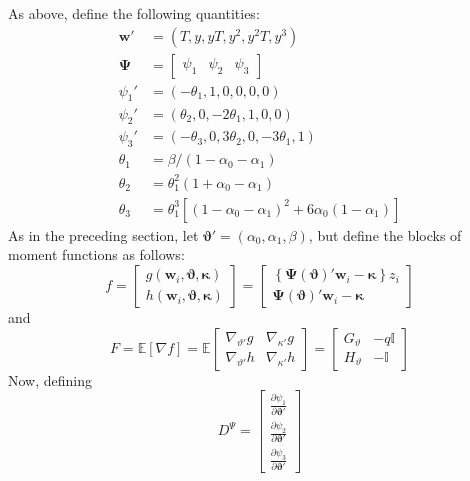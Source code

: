 \documentclass[12pt]{article}
\begin{document}
As above, define the following quantities:
\begin{align*}
  \mathbf{w}' &= (T, y, yT, y^2, y^2 T, y^3) \\
  \boldsymbol{\Psi} &= \left[
  \begin{array}{ccc}
    \psi_1 & \psi_2 & \psi_3
  \end{array}
\right]\\
  \psi_1' &= (-\theta_1, 1, 0, 0, 0, 0)\\
  \psi_2' &= (\theta_2, 0, -2\theta_1, 1, 0, 0)\\
  \psi_3' &= (-\theta_3, 0, 3\theta_2, 0, -3\theta_1, 1)\\
  \theta_1 &= \beta/(1 - \alpha_0 - \alpha_1)\\
  \theta_2 &= \theta_1^2 (1 + \alpha_0 - \alpha_1) \\
  \theta_3 &= \theta_1^3 \left[ (1 - \alpha_0 - \alpha_1)^2 + 6\alpha_0(1 - \alpha_1) \right]
\end{align*}
As in the preceding section, let $\boldsymbol{\vartheta}' = (\alpha_0, \alpha_1, \beta)$, but define the blocks of moment functions as follows:
\[
  f = \left[
  \begin{array}{c}
  g(\mathbf{w}_i, \boldsymbol{\vartheta}, \boldsymbol{\kappa})\\
    h(\mathbf{w}_i, \boldsymbol{\vartheta}, \boldsymbol{\kappa})
  \end{array}
\right] = 
\left[
\begin{array}{c}
  \left\{\boldsymbol{\Psi}(\boldsymbol{\vartheta})'\mathbf{w}_i - \boldsymbol{\kappa}\right\} z_i \\
  \boldsymbol{\Psi}(\boldsymbol{\vartheta})'\mathbf{w}_i - \boldsymbol{\kappa} 
\end{array}
\right]
\]
and 
\[
  F = \mathbb{E}[\nabla f ] = \mathbb{E}\left[
  \begin{array}{cc}
    \nabla_{\vartheta'} g & \nabla_{\kappa'} g \\
    \nabla_{\vartheta'} h & \nabla_{\kappa'} h
  \end{array}
\right] = 
\left[
\begin{array}{cc}
  G_{\vartheta} & -q\mathbb{I} \\
  H_{\vartheta} & -\mathbb{I}
\end{array}
\right]
\]
Now, defining
\[
  D^\Psi = \left[
  \begin{array}{c}
    \frac{\partial\psi_1}{\partial \boldsymbol{\vartheta}'}\\
    \frac{\partial\psi_2}{\partial \boldsymbol{\vartheta}'}\\
    \frac{\partial\psi_3}{\partial \boldsymbol{\vartheta}'}
  \end{array}
\right]
\]
\end{document}
